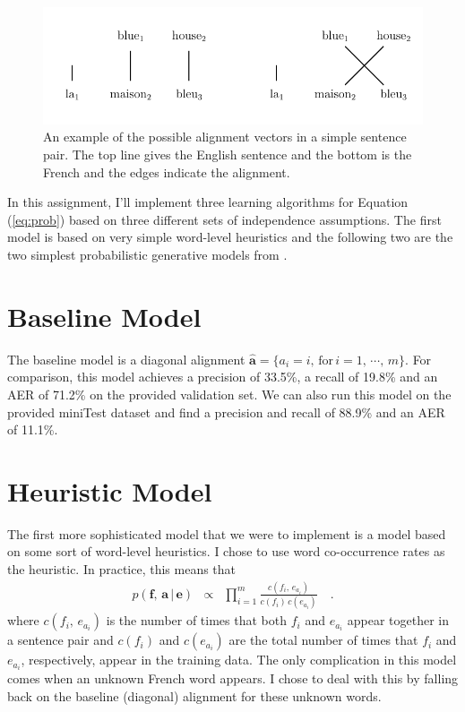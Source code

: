 \documentclass[11pt]{article}
\newcommand{\eq}[1]{Equation (\ref{eq:#1})}
\newcommand{\figlabel}[1]{\label{fig:#1}}
\newcommand{\bvec}[1]{\ensuremath{\boldsymbol{#1}}}
\newcommand{\code}[1]{{\sffamily #1}}
\begin{document}
\begin{figure}[htbp]
\begin{center}
    \includegraphics{fig1.pdf}
\end{center}
\caption{%
An example of the possible alignment vectors in a simple sentence pair.
The top line gives the English sentence and the bottom is the French and the
edges indicate the alignment.
\figlabel{blue-house}}
\end{figure}

In this assignment, I'll implement three learning algorithms for \eq{prob}
based on three different sets of independence assumptions.
The first model is based on very simple word-level heuristics and the
following two are the two simplest probabilistic generative models from
\citet{ibm}.

\section{Baseline Model}

The baseline model is a diagonal alignment $\hat{\bvec{a}} = \{a_i =
i,\,\mathrm{for}\,i=1,\,\cdots,\,m\}$.
For comparison, this model achieves a precision of 33.5\%, a recall of 19.8\%
and an AER of 71.2\% on the provided validation set.
We can also run this model on the provided \code{miniTest} dataset and find a
precision and recall of 88.9\% and an AER of 11.1\%.

\section{Heuristic Model}

The first more sophisticated model that we were to implement is a model based
on some sort of word-level heuristics.
I chose to use word co-occurrence rates as the heuristic.
In practice, this means that
\begin{eqnarray}
p(\bvec{f},\,\bvec{a}\,|\,\bvec{e}) &\propto&
    \prod_{i=1}^m \frac{c(f_i,\,e_{a_i})}{c(f_i)\,c(e_{a_i})} \quad.
\end{eqnarray}
where $c(f_i,\,e_{a_i})$ is the number of times that both $f_i$ and $e_{a_i}$
appear together in a sentence pair and $c(f_i)$ and $c(e_{a_i})$ are the
total number of times that $f_i$ and $e_{a_i}$, respectively, appear in the
training data.
The only complication in this model comes when an unknown French word appears.
I chose to deal with this by falling back on the baseline (diagonal) alignment
for these unknown words.
\end{document}
